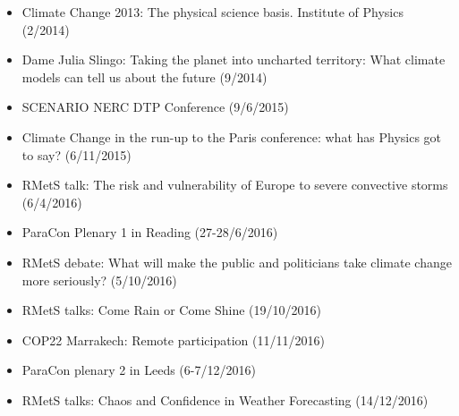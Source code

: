 \documentclass[11pt,a4paper]{article}
\begin{document}
\begin{itemize}
  \item Climate Change 2013: The physical science basis. Institute of Physics (2/2014)
  \item Dame Julia Slingo: Taking the planet into uncharted territory: What climate models can tell us about the future (9/2014)
  \item SCENARIO NERC DTP Conference (9/6/2015)
  \item Climate Change in the run-up to the Paris conference: what has Physics got to say? (6/11/2015)
  \item RMetS talk: The risk and vulnerability of Europe to severe convective storms (6/4/2016)
  \item ParaCon Plenary 1 in Reading (27-28/6/2016)
  \item RMetS debate: What will make the public and politicians take climate change more seriously? (5/10/2016)
  \item RMetS talks: Come Rain or Come Shine (19/10/2016)
  \item COP22 Marrakech: Remote participation (11/11/2016)
  \item ParaCon plenary 2 in Leeds (6-7/12/2016)
  \item RMetS talks: Chaos and Confidence in Weather Forecasting (14/12/2016)
\end{itemize}
\end{document}
